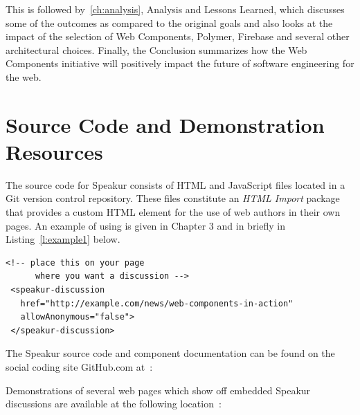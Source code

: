 This is followed by~\cref{ch:analysis}, Analysis and Lessons Learned, which discusses some of the outcomes 
as compared to the original goals and also looks at the impact of the selection of Web Components, 
Polymer, Firebase and several other architectural choices. 
Finally, the Conclusion summarizes how the Web Components initiative will positively impact the future of software engineering for the web. 

\section{Source Code and Demonstration Resources}

The source code for Speakur consists of HTML and JavaScript files located in a Git version control repository. 
These files constitute an \textit{HTML Import} package that provides a
\textbf{}
custom HTML element for the use of web authors in their own pages.
An example of using  is given in Chapter 3 and in briefly in Listing~\ref{l:example1} below.

\begin{lstlisting}[language=HTML5,caption={Speakur custom HTML element},label=l:example1]
 <!-- place this on your page
      where you want a discussion -->
 <speakur-discussion
   href="http://example.com/news/web-components-in-action"
   allowAnonymous="false">
 </speakur-discussion>
\end{lstlisting}

The Speakur source code and component documentation can be found on the social coding site GitHub.com at~\cite{landers2015-b}:


Demonstrations of several web pages which show off embedded Speakur discussions are available at the following location~\cite{landers2015-c}:

